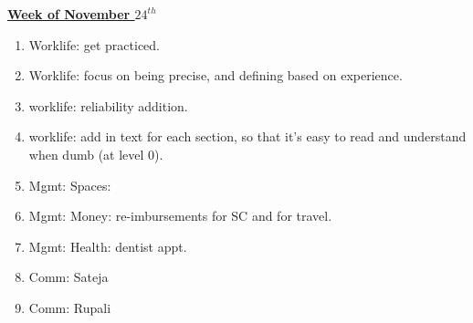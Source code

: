 \documentclass[serif, mathserif, final]{beamer}
\begin{document}
{\begin{frame}{}
\begin{columns}
\begin{column}{0.5\linewidth}
\begin{block} {\small \underline{\textbf{Week of November $24^{th}$}} }
\begin{enumerate}
\tiny \item \tiny Worklife: get practiced. 
\tiny \item \tiny Worklife: focus on being precise, and defining based on experience. 
\tiny \item \tiny worklife: reliability addition. 
\tiny \item \tiny worklife: add in text for each section, so that it's easy to read and understand when dumb (at level 0).
\item \tiny Mgmt: Spaces: 
\item \tiny Mgmt: Money: re-imbursements for SC and for travel. 
\item \tiny Mgmt: Health: dentist appt. 

\item \tiny Comm: Sateja 
\item \tiny Comm: Rupali 
\end{enumerate}
\end{block} 

\end{column}%


\end{columns}
\end{frame}}
\end{document}
